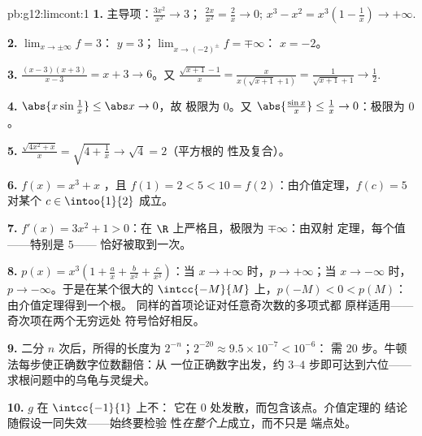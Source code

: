 \begin{solution}{pb:g12:limcont:1}
\textbf{1.} 主导项：$\frac{3x^2}{x^2} \to 3$；
$\frac{2x}{x^2} = \frac2x \to 0$;
$x^3 - x^2 = x^3\left(1 - \frac1x\right) \to +\infty$.

\textbf{2.} $\lim_{x \to \pm\infty} f = 3$： $y = 3$；$\lim_{x \to (-2)^\pm} f = \mp\infty$：
 $x = -2$。

\textbf{3.} $\frac{(x-3)(x+3)}{x - 3} = x + 3 \to 6$。又
$\frac{\sqrt{x+1} - 1}{x} = \frac{x}{x(\sqrt{x+1} + 1)} =
\frac{1}{\sqrt{x+1} + 1} \to \frac12$.

\textbf{4.} $\abs{x \sin\frac1x} \leq \abs x \to 0$，故
极限为 $0$。又
$\abs{\frac{\sin x}{x}} \leq \frac1x \to 0$：极限为 $0$。

\textbf{5.} $\frac{\sqrt{4x^2 + x}}{x} =
\sqrt{4 + \frac1x} \to \sqrt4 = 2$（平方根的
性及复合）。

\textbf{6.} $f(x) = x^3 + x$ ，且
$f(1) = 2 < 5 < 10 = f(2)$：由介值定理，$f(c) = 5$ 对某个
$c \in \intoo{1}{2}$ 成立。

\textbf{7.} $f'(x) = 3x^2 + 1 > 0$：在
$\R$ 上严格且，极限为 $\mp\infty$：由双射
定理，每个值——特别是 $5$——
恰好被取到一次。

\textbf{8.} $p(x) = x^3\left(1 + \frac ax + \frac{b}{x^2} +
\frac{c}{x^3}\right)$：当 $x \to +\infty$ 时，$p \to +\infty$；当
$x \to -\infty$ 时，$p \to -\infty$。于是在某个很大的
$\intcc{-M}{M}$ 上，$p(-M) < 0 < p(M)$：由介值定理得到一个根。
同样的首项论证对任意奇次数的多项式都
原样适用——奇次项在两个无穷远处
符号恰好相反。

\textbf{9.} 二分 $n$ 次后，所得的长度为
$2^{-n}$；$2^{-20} \approx 9.5 \times 10^{-7} < 10^{-6}$：
需 20 步。牛顿法每步使正确数字位数翻倍：从
一位正确数字出发，约 $3$--$4$ 步即可达到六位——
求根问题中的乌龟与灵缇犬。

\textbf{10.} $g$ 在 $\intcc{-1}{1}$ 上不：
它在 $0$ 处发散，而包含该点。介值定理的
结论随假设一同失效——始终要检验
性\emph{在整个上}成立，而不只是
端点处。


\end{solution}
